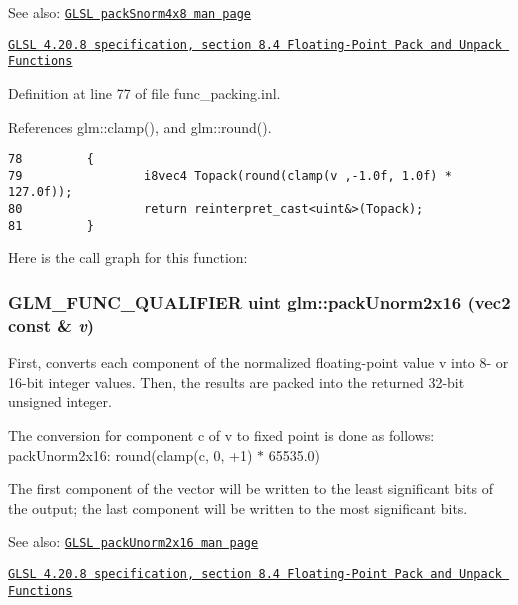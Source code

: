 \begin{Desc}
\item[See also:]\href{http://www.opengl.org/sdk/docs/manglsl/xhtml/packSnorm4x8.xml}{\tt GLSL packSnorm4x8 man page} 

\href{http://www.opengl.org/registry/doc/GLSLangSpec.4.20.8.pdf}{\tt GLSL 4.20.8 specification, section 8.4 Floating-Point Pack and Unpack Functions} \end{Desc}


Definition at line 77 of file func\_\-packing.inl.

References glm::clamp(), and glm::round().

\begin{Code}\begin{verbatim}78         {
79                 i8vec4 Topack(round(clamp(v ,-1.0f, 1.0f) * 127.0f));
80                 return reinterpret_cast<uint&>(Topack);
81         }
\end{verbatim}
\end{Code}




Here is the call graph for this function:\hypertarget{group__core__func__packing_g0659ddaf09727551c7bf51655d2a65cf}{
\subsubsection[packUnorm2x16]{\setlength{\rightskip}{0pt plus 5cm}GLM\_\-FUNC\_\-QUALIFIER uint glm::packUnorm2x16 (vec2 const \& {\em v})}}
\label{group__core__func__packing_g0659ddaf09727551c7bf51655d2a65cf}


First, converts each component of the normalized floating-point value v into 8- or 16-bit integer values. Then, the results are packed into the returned 32-bit unsigned integer.

The conversion for component c of v to fixed point is done as follows: packUnorm2x16: round(clamp(c, 0, +1) $\ast$ 65535.0)

The first component of the vector will be written to the least significant bits of the output; the last component will be written to the most significant bits.

\begin{Desc}
\item[See also:]\href{http://www.opengl.org/sdk/docs/manglsl/xhtml/packUnorm2x16.xml}{\tt GLSL packUnorm2x16 man page} 

\href{http://www.opengl.org/registry/doc/GLSLangSpec.4.20.8.pdf}{\tt GLSL 4.20.8 specification, section 8.4 Floating-Point Pack and Unpack Functions} \end{Desc}


